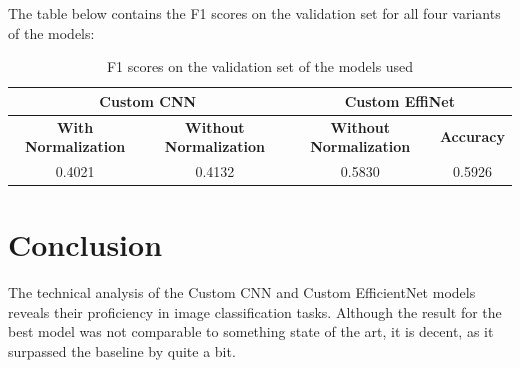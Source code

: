 \documentclass{article}
\begin{document}
The table below contains the F1 scores on the validation set for all four variants of the models:
\begin{table}[h]
	\centering
	\caption{F1 scores on the validation set of the models used}
	\label{table1}
	\begin{tabular}{cccc}
		\bottomrule
		\multicolumn{2}{|c|}{\textbf{Custom CNN}} &
		\multicolumn{2}{c|}{\textbf{Custom EffiNet}} \\
		\toprule
		\textbf{With Normalization}& \textbf{Without Normalization}& \textbf{Without Normalization}& \textbf{Accuracy} \\
		\midrule
		0.4021 & 0.4132 & 0.5830 & 0.5926 \\
 		\bottomrule
	\end{tabular}
\end{table}

\section{Conclusion}
The technical analysis of the Custom CNN and Custom EfficientNet models reveals their proficiency in image classification tasks. Although the result for the best model was not comparable to something state of the art, it is decent, as it surpassed the baseline by quite a bit.

\newpage



\begin{thebibliography}{1.7} 
\end{thebibliography}
\end{document}
